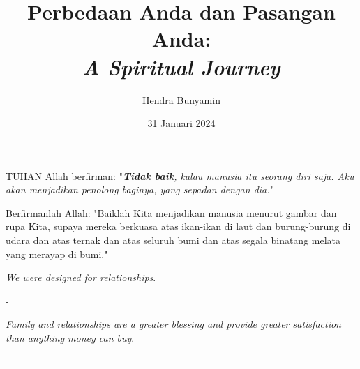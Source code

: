 \documentclass{beamer}
\title[Perbedaan]{%
    Perbedaan Anda dan Pasangan Anda: \\
    \textit{A Spiritual Journey}
}
\author{Hendra Bunyamin}
\institute{
        \textit{ }\\
		\textit{ }
        \vspace{0.5cm}
}
\date[Venue and Date]{%
    31 Januari 2024
}
\begin{document}

{
    \maketitle
}


\begin{frame}{}
	\Large
	\begin{tcolorbox}[colback=green!5,colframe=green!40!black,title=Kejadian 2:18 (TB)]
		TUHAN Allah berfirman: "\textit{\textbf{Tidak baik}, kalau manusia itu seorang diri saja. Aku akan menjadikan penolong baginya, yang sepadan dengan dia.}"
	\end{tcolorbox}
\end{frame}

\begin{frame}{}
	\Large
\begin{tcolorbox}[colback=green!5,colframe=green!40!black,title=Kejadian 1:26 (TB)]
Berfirmanlah Allah: "Baiklah Kita menjadikan manusia menurut gambar dan rupa Kita, supaya mereka berkuasa atas ikan-ikan di laut dan burung-burung di udara dan atas ternak dan atas seluruh bumi dan atas segala binatang melata yang merayap di bumi."
\end{tcolorbox}
\end{frame}

\begin{frame}{}
	\LARGE
	\centering
	\textit{We were designed for relationships}.
	
	\bigskip
	\normalsize
	- \citet{keller2013themeaning}
\end{frame}

\begin{frame}{}
	\LARGE
	\centering
	\textit{Family and relationships are a greater blessing and provide greater satisfaction than anything money can buy}.
	
	\bigskip
	\normalsize
	- \citet{keller2013themeaning}	
\end{frame}
\end{document}
